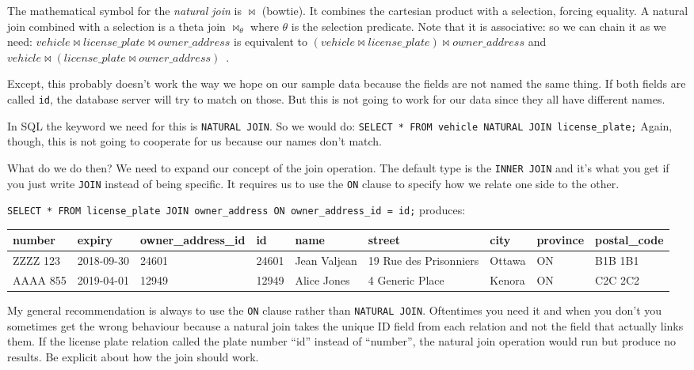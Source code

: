 \documentclass[a4paper]{report}
\begin{document}
The mathematical symbol for the \textit{natural join} is $\Join$ (bowtie). It combines the cartesian product with a selection, forcing equality. A natural join combined with a selection is a theta join $\Join_{\theta}$ where $\theta$ is the selection predicate. Note that it is associative: so we can chain it as we need: $vehicle \Join license\_plate \Join owner\_address$ is equivalent to  $(vehicle \Join license\_plate) \Join owner\_address$  and $vehicle \Join (license\_plate \Join owner\_address)$~\cite{dsc}. 

Except, this probably doesn't work the way we hope on our sample data because the fields are not named the same thing. If both fields are called \texttt{id}, the database server will try to match on those. But this is not going to work for our data since they all have different names. 

In SQL the keyword we need for this is \texttt{NATURAL JOIN}. So we would do: \texttt{SELECT * FROM vehicle NATURAL JOIN license\_plate;} Again, though, this is not going to cooperate for us because our names don't match.

What do we do then? We need to expand our concept of the join operation. The default type is the \texttt{INNER JOIN} and it's what you get if you just write \texttt{JOIN} instead of being specific. It requires us to use the \texttt{ON} clause to specify how we relate one side to the other.

\texttt{SELECT * FROM license\_plate JOIN owner\_address ON owner\_address\_id = id;} produces:

{\scriptsize
\begin{center}
	\begin{tabular}{|l|l|l|l|l|l|l|l|l|}\hline
		\textbf{number} & \textbf{expiry} & \textbf{owner\_address\_id} & \textbf{id} & \textbf{name} &\textbf{street} & \textbf{city} & \textbf{province} & \textbf{postal\_code} \\ \hline
		ZZZZ 123 & 2018-09-30 & 24601 & 24601 & Jean Valjean & 19 Rue des Prisonniers & Ottawa & ON & B1B 1B1\\ \hline
		AAAA 855 & 2019-04-01 & 12949 & 12949 & Alice Jones & 4 Generic Place & Kenora & ON & C2C 2C2\\ \hline
	\end{tabular}
\end{center}
}

My general recommendation is always to use the \texttt{ON} clause rather than \texttt{NATURAL JOIN}. Oftentimes you need it and when you don't you sometimes get the wrong behaviour because a natural join takes the unique ID field from each relation and not the field that actually links them. If the license plate relation called the plate number ``id'' instead of ``number'', the natural join operation would run but produce no results. Be explicit about how the join should work.
\end{document}
